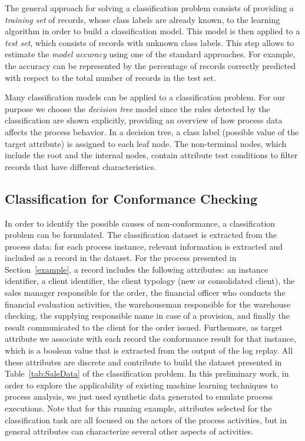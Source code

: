 \documentclass{llncs}
\begin{document}
The general approach for solving a classification problem consists of providing a \emph{training set} of records, whose class labels are already known, to the learning algorithm in order to build a classification model. This model is then applied to a \emph{test set}, which consists of records with unknown class labels. This step allows to  estimate the \emph{model accuracy} using one of the standard approaches. For example, the accuracy can be represented by the percentage  of records correctly predicted  with respect to the total number of records in the test set.

Many classification models can be applied to a classification problem. For our purpose we choose the \emph{decision tree} model since the rules detected by the classification are shown explicitly, providing an overview of how process data affects the process behavior. In a decision tree, a class label (possible value of the target attribute) is assigned to each leaf node. The non-terminal nodes, which include the root and the internal nodes, contain attribute test conditions to filter records that have different characteristics.

\subsection{Classification for Conformance Checking}\label{ClassConformance}
In order to identify the possible causes of non-conformance, a classification problem can be formulated. The classification dataset is extracted from the process data: for each process instance, relevant information is  extracted and included as a record in the dataset. For the process presented in Section~\ref{example}, a record includes  the following attributes: an instance identifier, a  client identifier, the client typology (new or consolidated client), the sales manager responsible for the order, the financial officer who conducts the financial evaluation activities, the warehouseman responsible for the warehouse checking, the supplying responsible name in case of a provision, and finally the result communicated to the client for the order issued. Furthemore, as target attribute we associate with each record the conformance result for that instance,  which is a boolean value that is extracted from the output of the log replay. All these attributes are discrete and contribute to build the dataset
presented in Table~\ref{tab:SaleData} of the classification problem. In this preliminary work,  in order to 
explore the applicability of existing machine learning  techniques to process analysis, we just used synthetic data
generated to emulate process executions. Note that for this  running example, attributes selected for the classification task are all focused on the actors of the process activities, but in general attributes can characterize several other aspects of activities.
\end{document}
